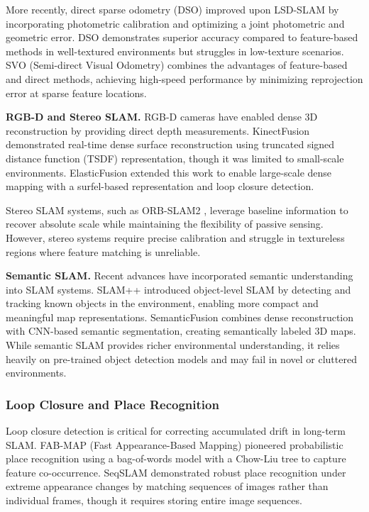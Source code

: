 More recently, direct sparse odometry (DSO) \cite{Engel2018} improved upon LSD-SLAM by incorporating photometric calibration and optimizing a joint photometric and geometric error. 
DSO demonstrates superior accuracy compared to feature-based methods in well-textured environments but struggles in low-texture scenarios.
SVO (Semi-direct Visual Odometry) \cite{Forster2014, Forster2017} combines the advantages of feature-based and direct methods, achieving high-speed performance by minimizing reprojection error at sparse feature locations.

\textbf{RGB-D and Stereo SLAM.}
RGB-D cameras have enabled dense 3D reconstruction by providing direct depth measurements.
KinectFusion \cite{Newcombe2011} demonstrated real-time dense surface reconstruction using truncated signed distance function (TSDF) representation, though it was limited to small-scale environments.
ElasticFusion \cite{Whelan2016} extended this work to enable large-scale dense mapping with a surfel-based representation and loop closure detection.

Stereo SLAM systems, such as ORB-SLAM2 \cite{MurArtal2017}, leverage baseline information to recover absolute scale while maintaining the flexibility of passive sensing.
However, stereo systems require precise calibration and struggle in textureless regions where feature matching is unreliable.

\textbf{Semantic SLAM.}
Recent advances have incorporated semantic understanding into SLAM systems.
SLAM++ \cite{Salas2013} introduced object-level SLAM by detecting and tracking known objects in the environment, enabling more compact and meaningful map representations.
SemanticFusion \cite{McCormac2017} combines dense reconstruction with CNN-based semantic segmentation, creating semantically labeled 3D maps.
While semantic SLAM provides richer environmental understanding, it relies heavily on pre-trained object detection models and may fail in novel or cluttered environments.

\subsubsection{Loop Closure and Place Recognition}

Loop closure detection is critical for correcting accumulated drift in long-term SLAM.
FAB-MAP (Fast Appearance-Based Mapping) \cite{Cummins2008, Paul2010} pioneered probabilistic place recognition using a bag-of-words model with a Chow-Liu tree to capture feature co-occurrence.
SeqSLAM \cite{Milford2012} demonstrated robust place recognition under extreme appearance changes by matching sequences of images rather than individual frames, though it requires storing entire image sequences.


